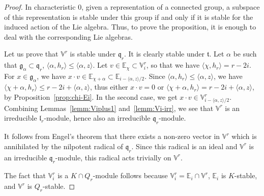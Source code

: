 \documentclass[10pt]{amsart}
\theoremstyle{plain}
\theoremstyle{definition}
\let\rgy r
\newcommand{\bE}{\mathbb{E}}
\newcommand{\Vr}{\mathbb{V}^\rgy}
\newcommand{\fgg}{\mathfrak{g}}
\newcommand{\fl}{\mathfrak{l}}
\newcommand{\fq}{\mathfrak{q}}
\newcommand{\ft}{\mathfrak{t}}
\newcommand{\scal}[1]{\langle #1 \rangle}
\begin{document}
\begin{proof}
In characteristic $0$, given a representation of a connected group, a subspace of this representation
is stable under this group if and only if it is stable for the induced action of the Lie
algebra. Thus, to prove the proposition, it is enough to deal with the corresponding Lie algebras.

Let us prove that $\Vr$ is stable under $\fq_\rgy$. It is clearly stable under $\ft$.
Let $\alpha$ be such that $\fgg_\alpha\subset\fq_\rgy$, \ie $\scal{\alpha,h_\rgy} \leq \scal{\alpha,z}$.
Let $v \in \bE_\chi \subset \Vr_i$, so that we have $\scal{\chi,h_\rgy} = \rgy-2i$.
For $x \in \fgg_\alpha$, we have $x \cdot v \in \bE_{\chi+\alpha} \subset \bE_{i-\scal{\alpha,z}/2}$. Since
$\scal{\alpha,h_\rgy} \leq \scal{\alpha,z}$, we have $\scal{\chi + \alpha, h_\rgy} \leq \rgy-2i+\scal{\alpha,z}$,
thus either $x \cdot v = 0$ or $\scal{\chi + \alpha, h_\rgy} = \rgy-2i+\scal{\alpha,z}$, by
Proposition~\ref{prop:chi-Ei}. In the second case, we get $x \cdot v \in \Vr_{i-\scal{\alpha,z}/2}$.
Combining Lemmas~\ref{lemm:Viplus1} and~\ref{lemm:Vi-irr}, we see that $\Vr$ is an irreducible
$\fl_\rgy$-module, hence also an irreducible $\fq_\rgy$\nobreakdash-module.

It follows from Engel's theorem that there exists a non-zero vector in $\Vr$ which is annihilated by the
nilpotent radical of $\fq_\rgy$. Since this radical is an ideal and $\Vr$ is an irreducible $\fq_\rgy$-module,
this radical acts trivially on $\Vr$.

The fact that $\Vr_i$ is a $K\cap Q_\rgy$-module follows because $\Vr_i = \bE_i \cap \Vr$, $\bE_i$ is $K$-stable, and
$\Vr$ is $Q_\rgy$-stable.


\end{proof}
\end{document}
